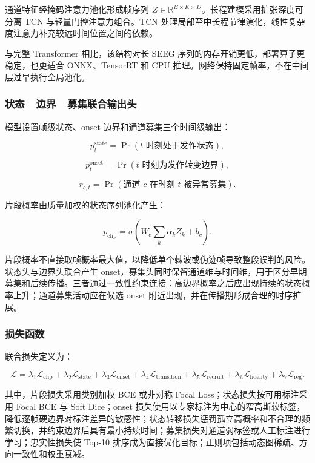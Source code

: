 \documentclass{cumcmthesis}
\numberwithin{figure}{section} %
\numberwithin{table}{section} %
\begin{document}
通道特征经掩码注意力池化形成帧序列 $Z\in\mathbb{R}^{B\times K\times D}$。长程建模采用扩张深度可分离 TCN 与轻量门控注意力组合。TCN 处理局部至中长程节律演化，线性复杂度注意力补充较远时间位置之间的依赖。

与完整 Transformer 相比，该结构对长 SEEG 序列的内存开销更低，部署算子更稳定，也更适合 ONNX、TensorRT 和 CPU 推理。网络保持固定帧率，不在中间层过早执行全局池化。

\subsubsection{状态—边界—募集联合输出头}

模型设置帧级状态、onset 边界和通道募集三个时间级输出：

$$
p_t^{\mathrm{state}}=\Pr(t\text{ 时刻处于发作状态}),
$$

$$
p_t^{\mathrm{onset}}=\Pr(t\text{ 时刻为发作转变边界}),
$$

$$
r_{c,t}=\Pr(\text{通道 }c\text{ 在时刻 }t\text{ 被异常募集}).
$$

片段概率由质量加权的状态序列池化产生：

$$
p_{\mathrm{clip}}=
\sigma\left(
W_c\sum_k\alpha_kZ_k+b_c
\right).
$$

片段概率不直接取帧概率最大值，以降低单个棘波或伪迹帧导致整段误判的风险。状态头与边界头联合产生 onset，募集头同时保留通道维与时间维，用于区分早期募集和后续传播。三者通过一致性约束连接：高边界概率之后应出现持续的状态概率上升；通道募集活动应在候选 onset 附近出现，并在传播期形成合理的时序扩展。

\subsubsection{损失函数}

联合损失定义为：

$$
\mathcal{L}=
\lambda_1\mathcal{L}_{\mathrm{clip}}
+\lambda_2\mathcal{L}_{\mathrm{state}}
+\lambda_3\mathcal{L}_{\mathrm{onset}}
+\lambda_4\mathcal{L}_{\mathrm{transition}}
+\lambda_5\mathcal{L}_{\mathrm{recruit}}
+\lambda_6\mathcal{L}_{\mathrm{fidelity}}
+\lambda_7\mathcal{L}_{\mathrm{reg}}.
$$

其中，片段损失采用类别加权 BCE 或非对称 Focal Loss；状态损失按可用标注采用 Focal BCE 与 Soft Dice；onset 损失使用以专家标注为中心的窄高斯软标签，降低逐帧硬边界对标注差异的敏感性；状态转移损失惩罚孤立高概率和不合理的频繁切换，并约束边界后具有最小持续时间；募集损失对通道弱标签或人工标注进行学习；忠实性损失使 Top-10 排序成为直接优化目标；正则项包括动态图稀疏、方向一致性和权重衰减。
\end{document}

